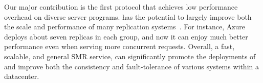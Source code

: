
Our major contribution is the first \paxos protocol that achieves  
low performance overhead on diverse server programs. \xxx has the potential 
to largely improve both the scale and performance of many replication 
systems~\cite{azure:book,manos:hotdep10,crane:sosp15,rex:eurosys14, 
ssmr:dsn14,spaxos:srds12}. For instance, Azure~\cite{azure:book} 
deploys about seven replicas in each \paxos group, and now it can enjoy 
much better performance even when serving more concurrent requests. 
Overall, a fast, scalable, and general SMR service, \xxx can significantly 
promote the deployments of \paxos and improve both the consistency and 
fault-tolerance of various systems within a datacenter.




